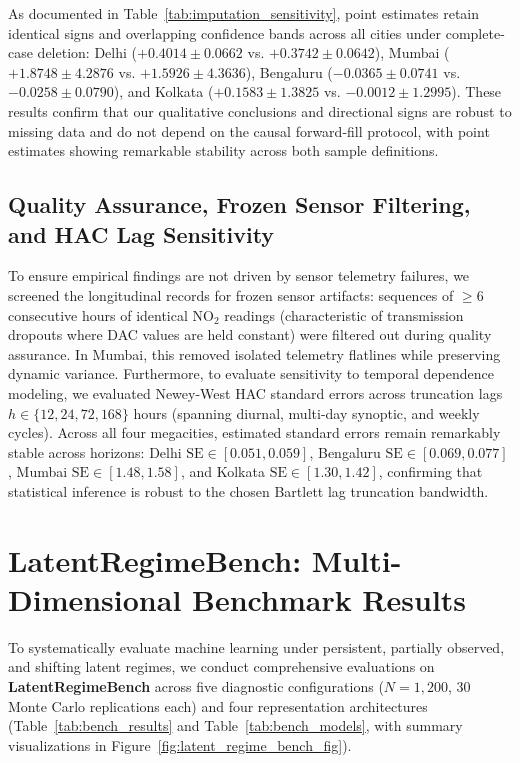\documentclass[twoside]{article}
\theoremstyle{definition}
\begin{document}
As documented in Table~\ref{tab:imputation_sensitivity}, point estimates retain identical signs and overlapping confidence bands across all cities under complete-case deletion: Delhi ($+0.4014 \pm 0.0662$ vs. $+0.3742 \pm 0.0642$), Mumbai ($+1.8748 \pm 4.2876$ vs. $+1.5926 \pm 4.3636$), Bengaluru ($-0.0365 \pm 0.0741$ vs. $-0.0258 \pm 0.0790$), and Kolkata ($+0.1583 \pm 1.3825$ vs. $-0.0012 \pm 1.2995$). These results confirm that our qualitative conclusions and directional signs are robust to missing data and do not depend on the causal forward-fill protocol, with point estimates showing remarkable stability across both sample definitions.

\subsection{Quality Assurance, Frozen Sensor Filtering, and HAC Lag Sensitivity}
\label{app:hac_frozen_sensitivity}
To ensure empirical findings are not driven by sensor telemetry failures, we screened the longitudinal records for frozen sensor artifacts: sequences of $\ge 6$ consecutive hours of identical $\text{NO}_2$ readings (characteristic of transmission dropouts where DAC values are held constant) were filtered out during quality assurance. In Mumbai, this removed isolated telemetry flatlines while preserving dynamic variance.
Furthermore, to evaluate sensitivity to temporal dependence modeling, we evaluated Newey-West HAC standard errors across truncation lags $h \in \{12, 24, 72, 168\}$ hours (spanning diurnal, multi-day synoptic, and weekly cycles). Across all four megacities, estimated standard errors remain remarkably stable across horizons: Delhi $\mathrm{SE} \in [0.051, 0.059]$, Bengaluru $\mathrm{SE} \in [0.069, 0.077]$, Mumbai $\mathrm{SE} \in [1.48, 1.58]$, and Kolkata $\mathrm{SE} \in [1.30, 1.42]$, confirming that statistical inference is robust to the chosen Bartlett lag truncation bandwidth.

\vspace{-2mm}
\section{LatentRegimeBench: Multi-Dimensional Benchmark Results}
\label{app:latent_regime_bench}
To systematically evaluate machine learning under persistent, partially observed, and shifting latent regimes, we conduct comprehensive evaluations on \textbf{LatentRegimeBench} across five diagnostic configurations ($N=1,200$, $30$ Monte Carlo replications each) and four representation architectures (Table~\ref{tab:bench_results} and Table~\ref{tab:bench_models}, with summary visualizations in Figure~\ref{fig:latent_regime_bench_fig}).
\end{document}
